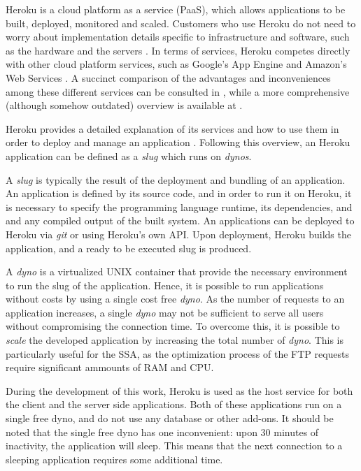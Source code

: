 Heroku is a cloud platform as a service (PaaS), which allows applications to be built, deployed, monitored and scaled. Customers who use Heroku do not need to worry about implementation details specific to infrastructure and software, such as the hardware and the servers \cite{heroku_what}. In terms of services, Heroku competes directly with other cloud platform services, such as Google's App Engine \cite{google_app} and Amazon's Web Services \cite{amazon_web}. A succinct comparison of the advantages and inconveniences among these different services can be consulted in \cite{cloud_comparison}, while a more comprehensive (although somehow outdated) overview is available at \cite{cloud_article}.

Heroku provides a detailed explanation of its services and how to use them in order to deploy and manage an application \cite{heroku_how}. Following this overview, an Heroku application can be defined as a \textit{slug} which runs on \textit{dynos}. 

A \textit{slug} is typically the result of the deployment and bundling of an application. An application is defined by its source code, and in order to run it on Heroku, it is necessary to specify the programming language runtime, its dependencies, and and any compiled output of the built system. An applications can be deployed to Heroku via \textit{git} or using Heroku's own API. Upon deployment, Heroku builds the application, and a ready to be executed slug is produced.

A \textit{dyno} is a virtualized UNIX container that provide the necessary environment to run the slug of the application. Hence, it is possible to run applications without costs by using a single cost free \textit{dyno}. As the number of requests to an application increases, a single \textit{dyno} may not be sufficient to serve all users without compromising the connection time. To overcome this, it is possible to \textit{scale} the developed application by increasing the total number of \textit{dyno}. This is particularly useful for the SSA, as the optimization process of the FTP requests require significant ammounts of RAM  and CPU.

During the development of this work, Heroku is used as the host service for both the client and the server side applications. Both of these applications run on a single free dyno, and do not use any database or other add-ons. It should be noted that the single free dyno has one inconvenient: upon 30 minutes of inactivity, the application will sleep. This means that the next connection to a sleeping application requires some additional time.  


